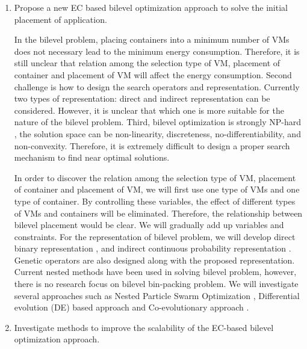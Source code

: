 \begin{enumerate}


	\item Propose a new EC based bilevel optimization approach to solve the initial placement of application.\\

	 In the bilevel problem, placing containers into a minimum number of VMs does not necessary lead to the minimum energy consumption. Therefore, it is still unclear that relation among the selection type of VM, placement of container and placement of VM will affect the energy consumption. Second challenge is how to design the search operators and representation. Currently two types of representation: direct and indirect representation can be considered. However, it is unclear that which one is more suitable for the nature of the bilevel problem. Third, bilevel optimization is strongly NP-hard \cite{Mathieu:2011dw}, the solution space can be non-linearity, discreteness, no-differentiability, and non-convexity. Therefore, it is extremely difficult to design a proper search mechanism to find near optimal solutions.

	In order to discover the relation among the selection type of VM, placement of container and placement of VM, we will first use one type of VMs and one type of container. By controlling these variables, the effect of different types of VMs and containers will be eliminated. Therefore, the relationship between bilevel placement would be clear. We will gradually add up variables and constraints. For the representation of bilevel problem, we will develop direct binary representation \cite{Xu:2010vh}, and indirect continuous probability representation \cite{Xiong:2014jq}. Genetic operators are also designed along with the proposed representation.
	Current nested methods have been used in solving bilevel problem, however, there is no research focus on bilevel bin-packing problem. We will investigate several approaches such as Nested Particle Swarm Optimization \cite{Li:2006br}, Differential evolution (DE) based approach \cite{Angelo:2013ee, Zhu:2006in} and Co-evolutionary approach \cite{Legillon:2012dd}.

	\item Investigate methods to improve the scalability of the EC-based bilevel optimization approach.


\end{enumerate}
